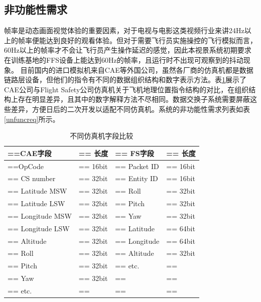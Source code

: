 \subsection{非功能性需求}
帧率是动态画面视觉体验的重要因素，对于电视与电影这类视频行业来讲24Hz以上的帧率便能达到良好的观看体验\cite{frame}。但对于需要飞行员实施操控的飞行模拟而言，60Hz以上的帧率才不会让飞行员产生操作延迟的感觉，因此本视景系统初期要求在训练基地的FFS设备上能达到60Hz的帧率，且运行时不出现可观察到的抖动现象。
目前国内的进口模拟机来自CAE等外国公司，虽然各厂商的仿真机都是数据链路层设备，但他们的指令有不同的数据组织结构和数字表示方法。表\ref{simsattr}展示了CAE公司与Flight Safety公司仿真机关于飞机地理位置指令结构的对比，在组织结构上存在明显差异，且其中的数字解释方法不尽相同。数据交换子系统需要屏蔽这些差异，方便日后的二次开发以适配不同仿真机。系统的非功能性需求列表如表\ref{unfuncreq}所示。
\begin{table}[htbp]
    \begin{center}
        \caption{不同仿真机字段比较}
        \label{simsattr}
        \renewcommand\arraystretch{1.2}
        \begin{tabularx}{\textwidth}{ 
            | >{\centering\arraybackslash\hsize=\hsize\linewidth=\hsize}X 
            | >{\centering\arraybackslash\hsize=\hsize\linewidth=\hsize}X 
            | >{\centering\arraybackslash\hsize=\hsize\linewidth=\hsize}X 
            | >{\centering\arraybackslash\hsize=\hsize\linewidth=\hsize}X 
            | }
            \hline
            \textbf{CAE字段} & \textbf{长度} & \textbf{FS字段} & \textbf{长度}\\
            \hline
            OpCode & 16bit & Packet ID & 16bit\\
            \hline
            CS number & 32bit & Entity ID & 16bit\\
            \hline
            Latitude MSW & 32bit & Roll & 32bit\\
            \hline
            Latitude LSW & 32bit & Pitch & 32bit\\
            \hline
            Longitude MSW & 32bit & Yaw & 32bit\\
            \hline
            Longitude LSW & 32bit & Latitude & 64bit\\
            \hline
            Altitude& 32bit & Longitude & 64bit\\
            \hline
            Roll & 32bit & Altitude & 32bit\\
            \hline
            Pitch& 32bit &  etc. & \\
            \hline
            Yaw & 32bit &  & \\
            \hline
            etc. & &  & \\
            \hline
        \end{tabularx}
    \end{center}
\end{table}
